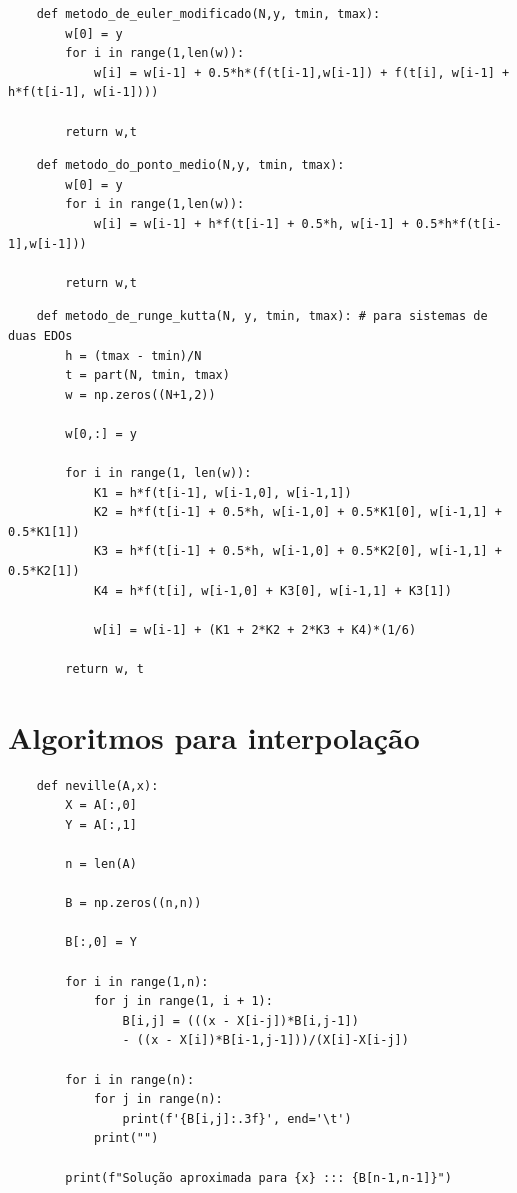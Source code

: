 \documentclass[a4paper, 11pt]{report}
\begin{document}
\begin{verbatim}
    def metodo_de_euler_modificado(N,y, tmin, tmax):
        w[0] = y
        for i in range(1,len(w)):
            w[i] = w[i-1] + 0.5*h*(f(t[i-1],w[i-1]) + f(t[i], w[i-1] + h*f(t[i-1], w[i-1])))
            
        return w,t    
\end{verbatim}
\begin{verbatim}
    def metodo_do_ponto_medio(N,y, tmin, tmax):
        w[0] = y
        for i in range(1,len(w)):
            w[i] = w[i-1] + h*f(t[i-1] + 0.5*h, w[i-1] + 0.5*h*f(t[i-1],w[i-1]))
            
        return w,t    
\end{verbatim}
\begin{verbatim}
    def metodo_de_runge_kutta(N, y, tmin, tmax): # para sistemas de duas EDOs
        h = (tmax - tmin)/N
        t = part(N, tmin, tmax)
        w = np.zeros((N+1,2))
        
        w[0,:] = y
        
        for i in range(1, len(w)):
            K1 = h*f(t[i-1], w[i-1,0], w[i-1,1])
            K2 = h*f(t[i-1] + 0.5*h, w[i-1,0] + 0.5*K1[0], w[i-1,1] + 0.5*K1[1])
            K3 = h*f(t[i-1] + 0.5*h, w[i-1,0] + 0.5*K2[0], w[i-1,1] + 0.5*K2[1])
            K4 = h*f(t[i], w[i-1,0] + K3[0], w[i-1,1] + K3[1])
            
            w[i] = w[i-1] + (K1 + 2*K2 + 2*K3 + K4)*(1/6)
            
        return w, t
\end{verbatim}
\section{Algoritmos para interpolação}
\begin{verbatim}
    def neville(A,x):
        X = A[:,0]
        Y = A[:,1]
        
        n = len(A)
        
        B = np.zeros((n,n))
        
        B[:,0] = Y
        
        for i in range(1,n):
            for j in range(1, i + 1):
                B[i,j] = (((x - X[i-j])*B[i,j-1])
                - ((x - X[i])*B[i-1,j-1]))/(X[i]-X[i-j])
        
        for i in range(n):
            for j in range(n):
                print(f'{B[i,j]:.3f}', end='\t')
            print("")
            
        print(f"Solução aproximada para {x} ::: {B[n-1,n-1]}")
\end{verbatim}
\end{document}
